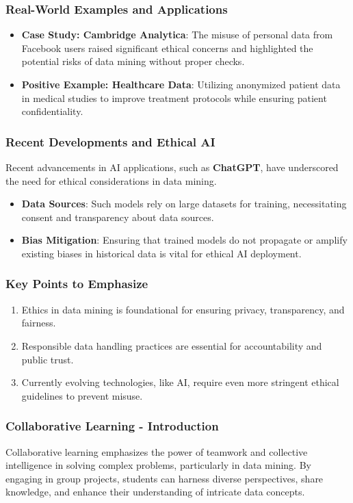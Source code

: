 \documentclass[aspectratio=169]{beamer}
\begin{document}
\begin{frame}[fragile]
    \frametitle{Real-World Examples and Applications}
    \begin{itemize}
        \item \textbf{Case Study: Cambridge Analytica}: The misuse of personal data from Facebook users raised significant ethical concerns and highlighted the potential risks of data mining without proper checks.
        
        \item \textbf{Positive Example: Healthcare Data}: Utilizing anonymized patient data in medical studies to improve treatment protocols while ensuring patient confidentiality.
    \end{itemize}
\end{frame}

\begin{frame}[fragile]
    \frametitle{Recent Developments and Ethical AI}
    Recent advancements in AI applications, such as \textbf{ChatGPT}, have underscored the need for ethical considerations in data mining. 

    \begin{itemize}
        \item \textbf{Data Sources}: Such models rely on large datasets for training, necessitating consent and transparency about data sources.
        \item \textbf{Bias Mitigation}: Ensuring that trained models do not propagate or amplify existing biases in historical data is vital for ethical AI deployment.
    \end{itemize}
\end{frame}

\begin{frame}[fragile]
    \frametitle{Key Points to Emphasize}
    \begin{enumerate}
        \item Ethics in data mining is foundational for ensuring privacy, transparency, and fairness.
        \item Responsible data handling practices are essential for accountability and public trust.
        \item Currently evolving technologies, like AI, require even more stringent ethical guidelines to prevent misuse.
    \end{enumerate}
\end{frame}

\begin{frame}[fragile]
    \frametitle{Collaborative Learning - Introduction}
    Collaborative learning emphasizes the power of teamwork and collective intelligence in solving complex problems, particularly in data mining. By engaging in group projects, students can harness diverse perspectives, share knowledge, and enhance their understanding of intricate data concepts.
\end{frame}
\end{document}
